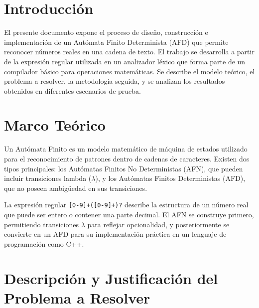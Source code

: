 \documentclass{article}
\begin{document}


\section{Introducción}\label{sec:intr}

El presente documento expone el proceso de diseño, construcción e implementación de un Autómata Finito Determinista (AFD) que permite reconocer números reales en una cadena de texto. El trabajo se desarrolla a partir de la expresión regular utilizada en un analizador léxico que forma parte de un compilador básico para operaciones matemáticas. Se describe el modelo teórico, el problema a resolver, la metodología seguida, y se analizan los resultados obtenidos en diferentes escenarios de prueba.


\section{Marco Teórico}\label{sec:marc}

Un Autómata Finito es un modelo matemático de máquina de estados utilizado para el reconocimiento de patrones dentro de cadenas de caracteres. Existen dos tipos principales: los Autómatas Finitos No Deterministas (AFN), que pueden incluir transiciones lambda ($\lambda$), y los Autómatas Finitos Deterministas (AFD), que no poseen ambigüedad en sus transiciones.

La expresión regular \texttt{[0-9]+(\.[0-9]+)?} describe la estructura de un número real que puede ser entero o contener una parte decimal. El AFN se construye primero, permitiendo transiciones $\lambda$ para reflejar opcionalidad, y posteriormente se convierte en un AFD para su implementación práctica en un lenguaje de programación como C++.

\section{Descripción y Justificación del Problema a Resolver}
\end{document}
